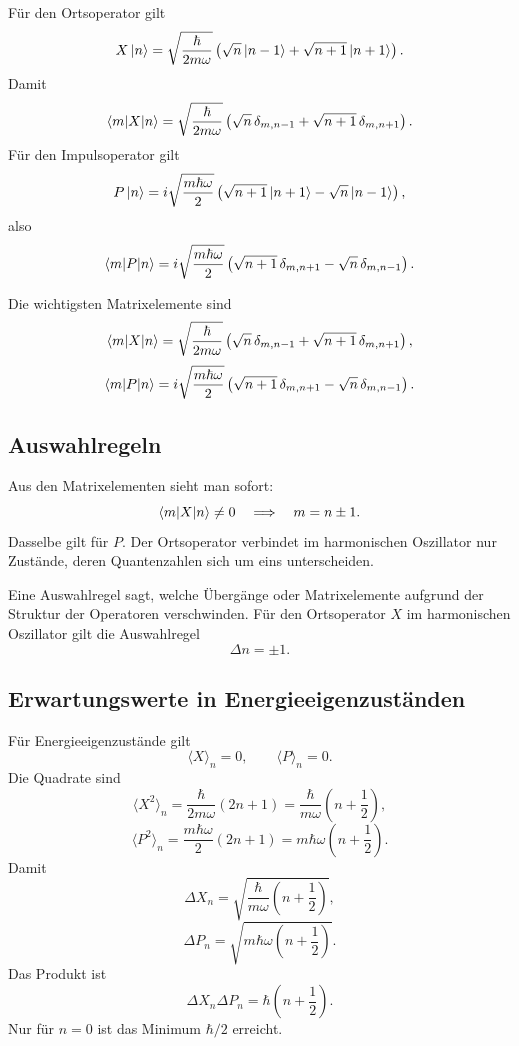 Für den Ortsoperator gilt
\[
    X\left|n\right\rangle=\sqrt{\frac{\hbar}{2m\omega}}\left(\sqrt n\left|n-1\right\rangle+\sqrt{n+1}\left|n+1\right\rangle\right).
\]
Damit
\[
    \left\langle m\middle|X\middle|n\right\rangle=\sqrt{\frac{\hbar}{2m\omega}}
    \left(\sqrt n\,\delta_{m,n-1}+\sqrt{n+1}\,\delta_{m,n+1}\right).
\]
Für den Impulsoperator gilt
\[
    P\left|n\right\rangle=i\sqrt{\frac{m\hbar\omega}{2}}
    \left(\sqrt{n+1}\left|n+1\right\rangle-\sqrt n\left|n-1\right\rangle\right),
\]
also
\[
    \left\langle m\middle|P\middle|n\right\rangle=i\sqrt{\frac{m\hbar\omega}{2}}
    \left(\sqrt{n+1}\,\delta_{m,n+1}-\sqrt n\,\delta_{m,n-1}\right).
\]

\begin{formulabox}
Die wichtigsten Matrixelemente sind
\[
    \left\langle m\middle|X\middle|n\right\rangle=\sqrt{\frac{\hbar}{2m\omega}}
    \left(\sqrt n\,\delta_{m,n-1}+\sqrt{n+1}\,\delta_{m,n+1}\right),
\]
\[
    \left\langle m\middle|P\middle|n\right\rangle=i\sqrt{\frac{m\hbar\omega}{2}}
    \left(\sqrt{n+1}\,\delta_{m,n+1}-\sqrt n\,\delta_{m,n-1}\right).
\]
\end{formulabox}

\subsection{Auswahlregeln}

Aus den Matrixelementen sieht man sofort:
\[
    \left\langle m\middle|X\middle|n\right\rangle\neq0
    \quad\Longrightarrow\quad
    m=n\pm1.
\]
Dasselbe gilt für $P$. Der Ortsoperator verbindet im harmonischen Oszillator nur Zustände, deren Quantenzahlen sich um eins unterscheiden.

\begin{conceptbox}
Eine Auswahlregel sagt, welche Übergänge oder Matrixelemente aufgrund der Struktur der Operatoren verschwinden. Für den Ortsoperator $X$ im harmonischen Oszillator gilt die Auswahlregel
\[
    \Delta n=\pm1.
\]
\end{conceptbox}

\subsection{Erwartungswerte in Energieeigenzuständen}

Für Energieeigenzustände gilt
\[
    \langle X\rangle_n=0,
    \qquad
    \langle P\rangle_n=0.
\]
Die Quadrate sind
\[
    \langle X^2\rangle_n=\frac{\hbar}{2m\omega}(2n+1)
    =\frac{\hbar}{m\omega}\left(n+\frac12\right),
\]
\[
    \langle P^2\rangle_n=\frac{m\hbar\omega}{2}(2n+1)
    =m\hbar\omega\left(n+\frac12\right).
\]
Damit
\[
    \Delta X_n=\sqrt{\frac{\hbar}{m\omega}\left(n+\frac12\right)},
\]
\[
    \Delta P_n=\sqrt{m\hbar\omega\left(n+\frac12\right)}.
\]
Das Produkt ist
\[
    \Delta X_n\Delta P_n=\hbar\left(n+\frac12\right).
\]
Nur für $n=0$ ist das Minimum $\hbar/2$ erreicht.

